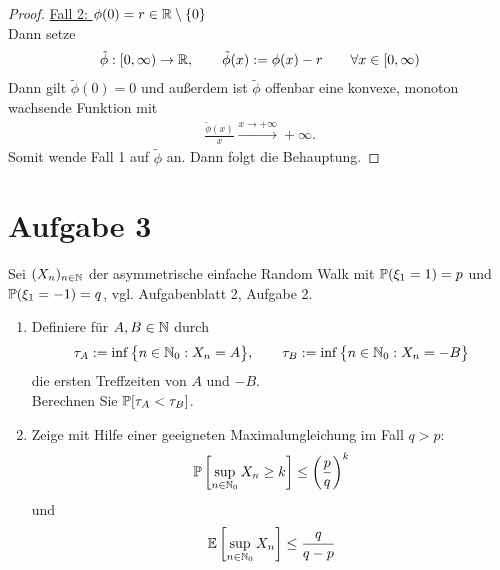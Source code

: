 \documentclass[12pt,a4paper]{article}
\begin{document}
\begin{proof}
\underline{Fall 2: $\phi(0)=r\in\R\setminus\lbrace0\rbrace$}\\
Dann setze
\begin{align*}
\tilde{\phi}:[0,\infty)\to\R,\qquad\tilde{\phi}(x):=\phi(x)-r\qquad\forall x\in[0,\infty)
\end{align*}
Dann gilt $\tilde{\phi}(0)=0$ und außerdem ist $\tilde{\phi}$ offenbar eine konvexe, monoton wachsende Funktion mit
\begin{align*}
\frac{\tilde{\phi}(x)}{x}\stackrel{x\to+\infty}{\longrightarrow}+\infty.
\end{align*}
Somit wende Fall 1 auf $\tilde{\phi}$ an. Dann folgt die Behauptung.

\end{proof}
\section*{Aufgabe 3}
Sei $(X_n)_{n\in\N}$ der asymmetrische einfache Random Walk mit $\P(\xi_1=1)=p$ und $\P(\xi_1=-1)=q$, vgl. Aufgabenblatt 2, Aufgabe 2.
\begin{enumerate}[label=\alph*)]
\item Definiere für $A,B\in\N$ durch
\begin{align*}
\tau_A:=\inf\big\lbrace n\in\N_0:X_n=A\big\rbrace,\qquad \tau_B:=\inf\limits\big\lbrace n\in\N_0:X_n=-B\big\rbrace
\end{align*}
die ersten Treffzeiten von $A$ und $-B$.\\
Berechnen Sie $\P[\tau_A<\tau_B]$.
\item Zeige mit Hilfe einer geeigneten Maximalungleichung im Fall $q>p$:
\begin{align}\label{eqAufgabe3bObere}
\P\left[\sup\limits_{n\in\N_0} X_n\geq k\right]\leq\left(\frac{p}{q}\right)^k
\end{align}
und 
\begin{align}\label{eqAufgabe3bUntere}
\E\left[\sup\limits_{n\in\N_0} X_n\right]\leq\frac{q}{q-p}
\end{align}
\end{enumerate}
\end{document}
